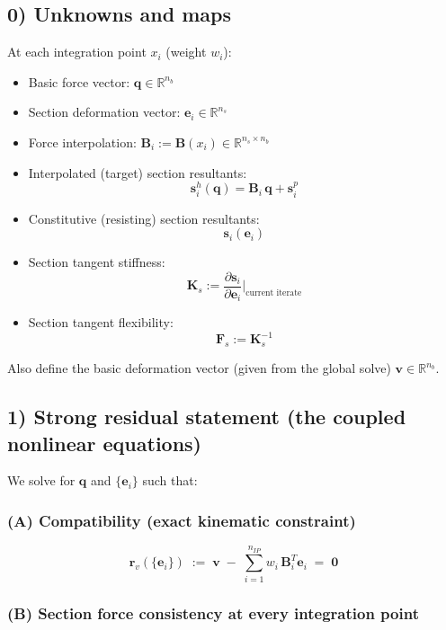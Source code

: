 
\subsection{0) Unknowns and maps}\label{unknowns-and-maps}

At each integration point \(x_i\) (weight \(w_i\)):

\begin{itemize}
\tightlist
\item
  Basic force vector: \(\bm{q}\in\mathbb{R}^{n_b}\)
\item
  Section deformation vector: \(\mathbf{e}_i \in \mathbb{R}^{n_s}\)
\item
  Force interpolation:
  \(\mathbf{B}_i := \mathbf{B}(x_i)\in\mathbb{R}^{n_s\times n_b}\)
\item
  Interpolated (target) section resultants: \[
  \mathbf{s}^h_i(\bm{q}) = \mathbf{B}_i\,\bm{q} + \mathbf{s}^{p}_i
  \]
\item
  Constitutive (resisting) section resultants: \[
  \mathbf{s}_i(\mathbf{e}_i)
  \]
\item
  Section tangent stiffness: \[
  \mathbf{K}_{s} := \frac{\partial \mathbf{s}_i}{\partial \mathbf{e}_i}\Big|_{\text{current iterate}}
  \]
\item
  Section tangent flexibility: \[
  \mathbf{F}_{s} := \mathbf{K}_{s}^{-1}
  \]
\end{itemize}

Also define the basic deformation vector (given from the global solve)
\(\bm{v}\in\mathbb{R}^{n_b}\).

\subsection{1) Strong residual statement (the coupled nonlinear
equations)}\label{strong-residual-statement-the-coupled-nonlinear-equations}

We solve for \(\bm{q}\) and \(\{\mathbf{e}_i\}\) such that:

\subsubsection{(A) Compatibility (exact kinematic
constraint)}\label{a-compatibility-exact-kinematic-constraint}

\[
\mathbf{r}_v(\{\mathbf{e}_i\}) \;:=\; \bm{v} \;-\; \sum_{i=1}^{n_{IP}} w_i\,\mathbf{B}_i^{T}\mathbf{e}_i \;=\;\mathbf{0}
\tag{1}
\]

\subsubsection{(B) Section force consistency at every integration
point}

